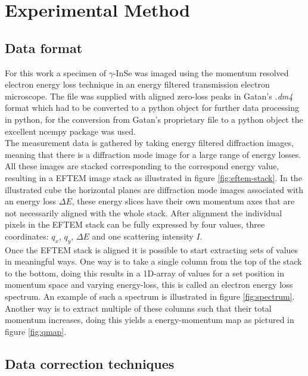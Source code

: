 \section{Experimental Method}
\subsection{Data format}
For this work a specimen of $\gamma$-InSe was imaged using the momentum resolved electron energy loss technique in an energy filtered transmission electron microscope.
The file was supplied with aligned zero-loss peaks in Gatan's \textit{.dm4} format which had to be converted to a python object for further data processing in python, for the conversion from Gatan's proprietary file to a python object the excellent ncempy package \cite{ncempy} was used.\\

The measurement data is gathered by taking energy filtered diffraction images, meaning that there is a diffraction mode image for a large range of energy losses.
All these images are stacked corresponding to the correspond energy value, resulting in a EFTEM image stack as illustrated in figure \ref{fig:eftem-stack}.
In the illustrated cube the horizontal planes are diffraction mode images associated with an energy loss $\Delta E$, these energy slices have their own momentum axes that are not necessarily aligned with the whole stack.
After alignment the individual pixels in the EFTEM stack can be fully expressed by four values, three coordinates: $q_x$, $q_y$, $\Delta E$ and one scattering intensity $I$.\\

Once the EFTEM stack is aligned it is possible to start extracting sets of values in meaningful ways. One way is to take a single column from the top of the stack to the bottom, doing this results in a 1D-array of values for a set position in momentum space and varying energy-loss, this is called an electron energy loss spectrum.
An example of such a spectrum is illustrated in figure \ref{fig:spectrum}. Another way is to extract multiple of these columns such that their total momentum increases, doing this yields a energy-momentum map as pictured in figure \ref{fig:qmap}.

\subsection{Data correction techniques}
